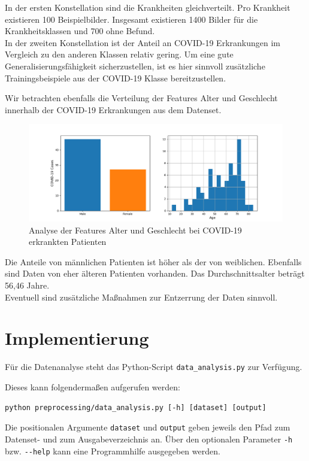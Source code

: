In der ersten Konstellation sind die Krankheiten gleichverteilt. Pro Krankheit existieren 100 Beispielbilder. Insgesamt existieren 1400 Bilder für die Krankheitsklassen und 700 ohne Befund.\\
In der zweiten Konstellation ist der Anteil an COVID-19 Erkrankungen im Vergleich zu den anderen Klassen relativ gering.
Um eine gute Generalisierungsfähigkeit sicherzustellen, ist es hier sinnvoll zusätzliche Trainingsbeispiele aus der COVID-19 Klasse bereitzustellen.

Wir betrachten ebenfalls die Verteilung der Features Alter und Geschlecht innerhalb der COVID-19 Erkrankungen aus dem Datenset.

\begin{figure}[ht]
	\centering
	\includegraphics[width=\textwidth]{../results/features_analysis.png}
	\caption{Analyse der Features Alter und Geschlecht bei COVID-19 erkrankten Patienten}
\end{figure}

Die Anteile von männlichen Patienten ist höher als der von weiblichen. Ebenfalls sind Daten von eher älteren Patienten vorhanden. Das Durchschnittsalter beträgt 56,46 Jahre.\\
Eventuell sind zusätzliche Maßnahmen zur Entzerrung der Daten sinnvoll.

\section{Implementierung}

Für die Datenanalyse steht das Python-Script \verb|data_analysis.py| zur Verfügung.

Dieses kann folgendermaßen aufgerufen werden:

\begin{verbatim}
python preprocessing/data_analysis.py [-h] [dataset] [output]
\end{verbatim}

Die positionalen Argumente \verb|dataset| und \verb|output| geben jeweils den Pfad zum Datenset- und zum Ausgabeverzeichnis an.
Über den optionalen Parameter \verb|-h| bzw. \verb|--help| kann eine Programmhilfe ausgegeben werden.